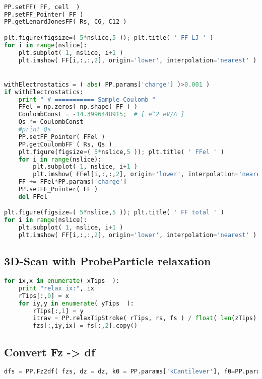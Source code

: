 \begin{shadedbox}
    \begin{lstlisting}[language=python]

PP.setFF( FF, cell  )
PP.setFF_Pointer( FF )
PP.getLenardJonesFF( Rs, C6, C12 )

plt.figure(figsize=( 5*nslice,5 )); plt.title( ' FF LJ ' )
for i in range(nslice):
    plt.subplot( 1, nslice, i+1 )
    plt.imshow( FF[i,:,:,2], origin='lower', interpolation='nearest' )


withElectrostatics = ( abs( PP.params['charge'] )>0.001 )
if withElectrostatics: 
    print " # =========== Sample Coulomb "
    FFel = np.zeros( np.shape( FF ) )
    CoulombConst = -14.3996448915;  # [ e^2 eV/A ]
    Qs *= CoulombConst
    #print Qs
    PP.setFF_Pointer( FFel )
    PP.getCoulombFF ( Rs, Qs )
    plt.figure(figsize=( 5*nslice,5 )); plt.title( ' FFel ' )
    for i in range(nslice):
        plt.subplot( 1, nslice, i+1 )
        plt.imshow( FFel[i,:,:,2], origin='lower', interpolation='nearest' )
    FF += FFel*PP.params['charge']
    PP.setFF_Pointer( FF )
    del FFel

plt.figure(figsize=( 5*nslice,5 )); plt.title( ' FF total ' )
for i in range(nslice):
    plt.subplot( 1, nslice, i+1 )
    plt.imshow( FF[i,:,:,2], origin='lower', interpolation='nearest' )
   \end{lstlisting}
\end{shadedbox}

\subsection{3D-Scan with ProbeParticle relaxation}
\begin{shadedbox}
    \begin{lstlisting}[language=python]
for ix,x in enumerate( xTips  ):
    print "relax ix:", ix
    rTips[:,0] = x
    for iy,y in enumerate( yTips  ):
        rTips[:,1] = y
        itrav = PP.relaxTipStroke( rTips, rs, fs ) / float( len(zTips) )
        fzs[:,iy,ix] = fs[:,2].copy()
    \end{lstlisting}
\end{shadedbox}



\subsection{Convert Fz -> df}
\begin{shadedbox}
    \begin{lstlisting}[language=python]
dfs = PP.Fz2df( fzs, dz = dz, k0 = PP.params['kCantilever'], f0=PP.params['f0Cantilever'], n=int(PP.params['Amplitude']/dz) )
    \end{lstlisting}
\end{shadedbox}



